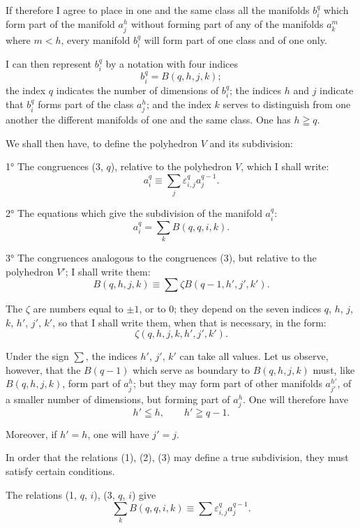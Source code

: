 \documentclass{article}
\begin{document}
If therefore I agree to place in one and the same class all the manifolds $b^{q}_{i}$ which form part of the manifold $a^{h}_{j}$ without forming part of any of the manifolds $a^{m}_{k}$ where $m < h$, every manifold $b^{q}_{i}$ will form part of one class and of one only.

I can then represent $b^{q}_{i}$ by a notation with four indices
\[ b^{q}_{i} = B(q, h, j, k); \]
the index $q$ indicates the number of dimensions of $b^{q}_{i}$; the indices $h$ and $j$ indicate that $b^{q}_{i}$ forms part of the class $a^{h}_{j}$; and the index $k$ serves to distinguish from one another the different manifolds of one and the same class. One has $h \geqq q$.

We shall then have, to define the polyhedron $V$ and its subdivision:

1° The congruences (3, $q$), relative to the polyhedron $V$, which I shall write:
\[ a^{q}_{i} \equiv \sum_{j} \varepsilon^{q}_{i,j} a^{q-1}_{j}. \tag{3, $q$, $i$} \]

2° The equations which give the subdivision of the manifold $a^{q}_{i}$:
\[ a^{q}_{i} = \sum_{k} B(q, q, i, k). \tag{1, $q$, $i$} \]

3° The congruences analogous to the congruences (3), but relative
to the polyhedron $V'$; I shall write them:
\[ B(q, h, j, k) \equiv \sum \zeta B(q - 1, h', j', k'). \tag{2, $q$, $h$, $j$, $k$} \]

The $\zeta$ are numbers equal to $\pm 1$, or to 0; they depend on the seven indices $q$, $h$, $j$, $k$, $h'$, $j'$, $k'$, so that I shall write them, when that is necessary, in the form:
\[ \zeta(q, h, j, k, h', j', k'). \]

Under the sign $\displaystyle\sum$, the indices $h'$, $j'$, $k'$ can take all values. Let us observe, however, that the $B(q - 1)$ which serve as boundary to $B(q, h, j, k)$ must, like $B(q, h, j, k)$, form part of $a^{h}_{j}$; but they may form part of other manifolds $a^{h'}_{j'}$, of a smaller number of dimensions, but forming part of $a^{h}_{j}$. One will therefore have
\[ h' \leqq h, \qquad h' \geqq q - 1. \]

Moreover, if $h' = h$, one will have $j' = j$.

In order that the relations (1), (2), (3) may define a true subdivision, they must satisfy certain conditions.

The relations (1, $q$, $i$), (3, $q$, $i$) give
\[ \sum_{k} B(q, q, i, k) \equiv \sum \varepsilon^{q}_{i,j} a^{q-1}_{j}. \tag{$\alpha$} \]
\end{document}
